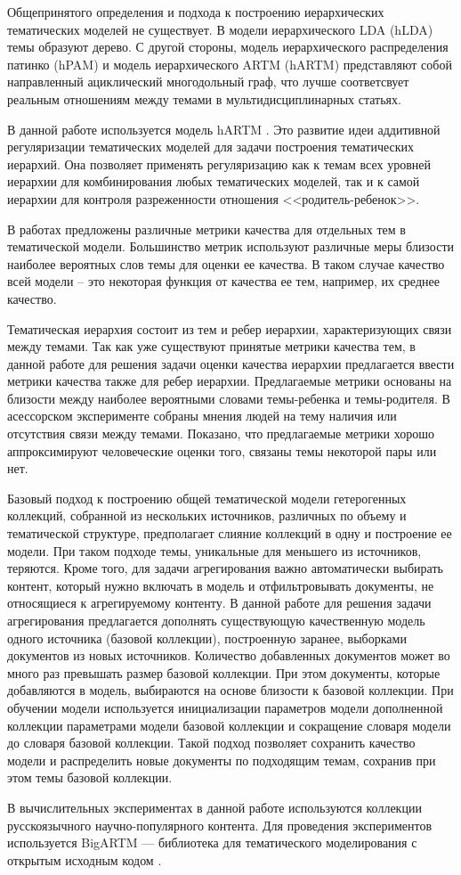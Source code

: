 Общепринятого определения и подхода к построению иерархических тематических моделей не существует. В модели иерархического LDA (hLDA) \cite{hLDA} темы образуют дерево. С другой стороны, модель иерархического распределения патинко (hPAM) \cite{hPAM} и модель иерархического ARTM (hARTM) \cite{hARTM} представляют собой направленный ациклический многодольный граф, что лучше соответсвует реальным отношениям между темами в мультидисциплинарных статьях.

В данной работе используется модель hARTM \cite{hARTM}. Это развитие идеи аддитивной регуляризации тематических моделей для задачи построения тематических иерархий.
Она позволяет применять регуляризацию как к темам всех уровней иерархии для комбинирования любых тематических моделей, так и к самой иерархии для контроля разреженности отношения <<родитель-ребенок>>.

В работах \cite{Mimno2011, Nikolenko2016, Nikolenko2017, Lau2014, Newman2010, Bouma2009} предложены различные метрики качества для отдельных тем в тематической модели. Большинство метрик используют различные меры близости наиболее вероятных слов темы для оценки ее качества. В таком случае качество всей модели -- это некоторая функция от качества ее тем, например, их среднее качество.

Тематическая иерархия состоит из тем и ребер иерархии, характеризующих связи между темами. Так как уже существуют принятые метрики качества тем, в данной работе для решения задачи оценки качества иерархии предлагается ввести метрики качества также для ребер иерархии. Предлагаемые метрики основаны на близости между наиболее вероятными словами темы-ребенка и темы-родителя. В асессорском эксперименте собраны мнения людей на тему наличия или отсутствия связи между темами. Показано, что предлагаемые метрики хорошо аппроксимируют человеческие оценки того, связаны темы некоторой пары или нет.

Базовый подход к построению общей тематической модели гетерогенных коллекций, собранной из нескольких источников, различных по объему и тематической структуре, предполагает слияние коллекций в одну и построение ее модели. При таком подходе темы, уникальные для меньшего из источников, теряются. Кроме того, для задачи агрегирования важно автоматически выбирать контент, который нужно включать в модель и отфильтровывать документы, не относящиеся к агрегируемому контенту. В данной работе для решения задачи агрегирования предлагается дополнять существующую качественную модель одного источника (базовой коллекции), построенную заранее, выборками документов из новых источников. Количество добавленных документов может во много раз превышать размер базовой коллекции. При этом документы, которые добавляются в модель, выбираются на основе близости к базовой коллекции. При обучении модели используется инициализации параметров модели дополненной коллекции параметрами модели базовой коллекции и сокращение словаря модели до словаря базовой коллекции. 
Такой подход позволяет сохранить качество модели и распределить новые документы по подходящим темам, сохранив при этом темы базовой коллекции. 


В вычислительных экспериментах в данной работе используются коллекции русскоязычного научно-популярного контента. Для проведения экспериментов используется BigARTM --- библиотека для тематического моделирования с открытым исходным кодом \cite{Vorontsov2015a, Frei2017}.